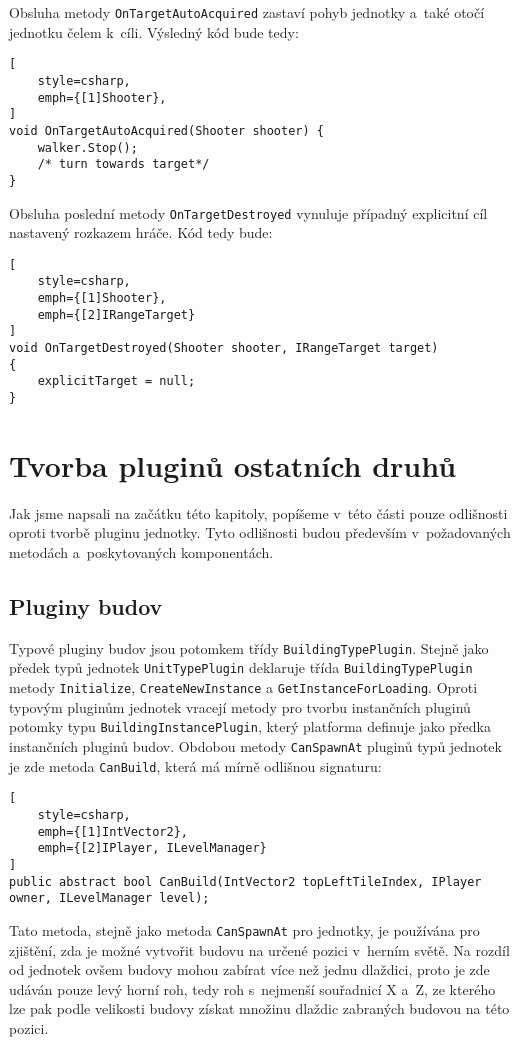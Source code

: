 Obsluha metody \texttt{OnTargetAutoAcquired} zastaví pohyb jednotky a~také otočí jednotku čelem k~cíli. Výsledný kód bude tedy:
\begin{lstlisting}[
	style=csharp,
	emph={[1]Shooter},
]
void OnTargetAutoAcquired(Shooter shooter) {
	walker.Stop();
	/* turn towards target*/
}
\end{lstlisting}

Obsluha poslední metody \texttt{OnTargetDestroyed} vynuluje případný explicitní cíl nastavený rozkazem hráče. Kód tedy bude:
\begin{lstlisting}[
	style=csharp,
	emph={[1]Shooter},
	emph={[2]IRangeTarget}
]
void OnTargetDestroyed(Shooter shooter, IRangeTarget target)
{
	explicitTarget = null;	
}
\end{lstlisting}

\section{Tvorba pluginů ostatních druhů}
Jak jsme napsali na začátku této kapitoly, popíšeme v~této části pouze odlišnosti oproti tvorbě pluginu jednotky. Tyto odlišnosti budou především v~požadovaných metodách a~poskytovaných komponentách.  

\subsection{Pluginy budov}
Typové pluginy budov jsou potomkem třídy \texttt{BuildingTypePlugin}.
Stejně jako předek typů jednotek \texttt{UnitTypePlugin} deklaruje třída \texttt{BuildingTypePlugin} metody \texttt{Initialize}, \texttt{CreateNewInstance} a \texttt{GetInstanceForLoading}. Oproti typovým pluginům jednotek vracejí metody pro tvorbu instančních pluginů potomky typu \texttt{BuildingInstancePlugin}, který platforma definuje jako předka instančních pluginů budov. Obdobou metody \texttt{CanSpawnAt} pluginů typů jednotek je zde metoda \texttt{CanBuild}, která má mírně odlišnou signaturu:

\begin{lstlisting}[
	style=csharp,
	emph={[1]IntVector2},
	emph={[2]IPlayer, ILevelManager}
]
public abstract bool CanBuild(IntVector2 topLeftTileIndex, IPlayer owner, ILevelManager level);
\end{lstlisting}

Tato metoda, stejně jako metoda \texttt{CanSpawnAt} pro jednotky, je používána pro zjištění, zda je možné vytvořit budovu na určené pozici v~herním světě. Na rozdíl od jednotek ovšem budovy mohou zabírat více než jednu dlaždici, proto je zde udáván pouze levý horní roh, tedy roh s~nejmenší souřadnicí X a~Z, ze kterého lze pak podle velikosti budovy získat množinu dlaždic zabraných budovou na této pozici. 


